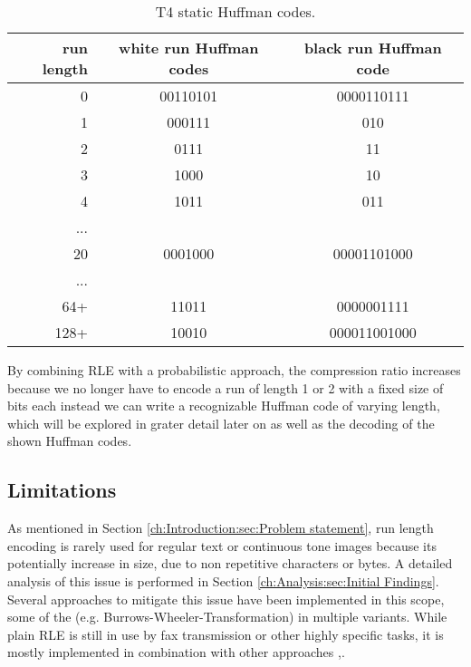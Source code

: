 \begin{table}
	\centering
	\begin{tabular}[p]{r|c|c}
		run length &  white run Huffman codes & black run Huffman code\\
		\hline
		0 &  00110101 & 0000110111\\
		1 & 000111 & 010\\
		2 & 0111 & 11\\
		3 & 1000 & 10\\
		4 & 1011 & 011\\
		... &  & \\
		20 & 0001000 & 00001101000\\
		... & & \\
		64+ & 11011 & 0000001111\\
		128+ & 10010 & 000011001000
		\label{tab:t1:static huffman codes}
	\end{tabular}
	\caption{T4 static Huffman codes.}
\end{table}
\par{
By combining RLE with a probabilistic approach, the compression ratio increases because we no longer have to encode a run of length 1 or 2 with a fixed size of bits each instead we can write a recognizable Huffman code of varying length, which will be explored in grater detail later on as well as the decoding of the shown Huffman codes.}

\subsection{Limitations}
\par{
As mentioned in Section \ref{ch:Introduction:sec:Problem statement}, run length encoding is rarely used for regular text or continuous tone images because its potentially increase in size, due to non repetitive characters or bytes. A detailed analysis of this issue is performed in Section \ref{ch:Analysis:sec:Initial Findings}. Several approaches to mitigate this issue have been implemented in this scope, some of the (e.g. Burrows-Wheeler-Transformation) in multiple variants. While plain RLE is still in use by fax transmission or other highly specific tasks, it is mostly implemented in combination with other approaches \cite{rle-dna},\cite{fax-rle}.
}
